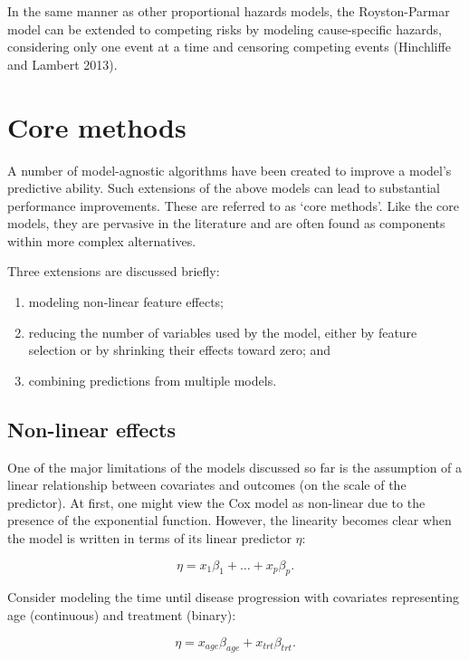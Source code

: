 \documentclass[
  letterpaper,
  krantz2]{style/krantz}
\providecommand{\tightlist}{%
  \setlength{\itemsep}{0pt}\setlength{\parskip}{0pt}}
\begin{document}
In the same manner as other proportional hazards models, the
Royston-Parmar model can be extended to competing risks by modeling
cause-specific hazards, considering only one event at a time and
censoring competing events (Hinchliffe and Lambert 2013).

\section{Core methods}\label{sec-classical-improving}

A number of model-agnostic algorithms have been created to improve a
model's predictive ability. Such extensions of the above models can lead
to substantial performance improvements. These are referred to as `core
methods'. Like the core models, they are pervasive in the literature and
are often found as components within more complex alternatives.

Three extensions are discussed briefly:

\begin{enumerate}
\def\labelenumi{\arabic{enumi}.}
\tightlist
\item
  modeling non-linear feature effects;
\item
  reducing the number of variables used by the model, either by feature
  selection or by shrinking their effects toward zero; and
\item
  combining predictions from multiple models.
\end{enumerate}

\subsection{Non-linear effects}\label{sec-nonlinear}

One of the major limitations of the models discussed so far is the
assumption of a linear relationship between covariates and outcomes (on
the scale of the predictor). At first, one might view the Cox model as
non-linear due to the presence of the exponential function. However, the
linearity becomes clear when the model is written in terms of its linear
predictor \(\eta\): 

\[
\eta = x_1\beta_1 + \ldots + x_p\beta_p.
\]

Consider modeling the time until disease progression with covariates
representing age (continuous) and treatment (binary):

\[
\eta = x_{age}\beta_{age} + x_{trt}\beta_{trt}.
\]
\end{document}
